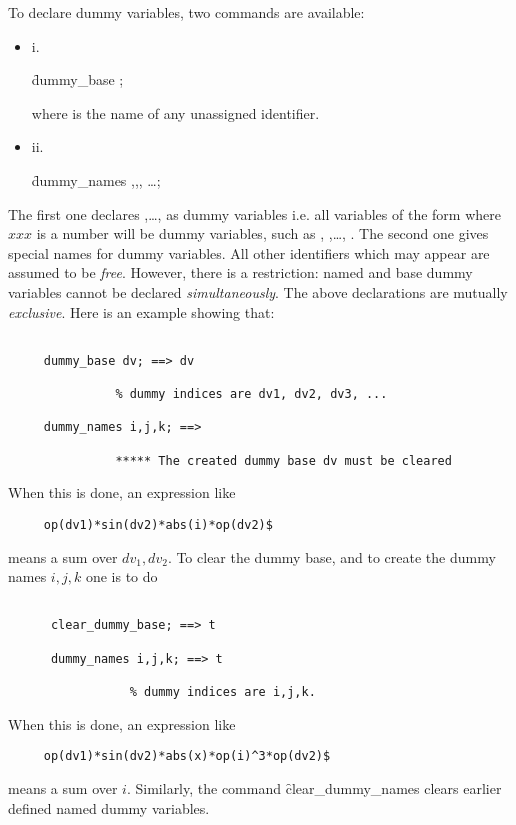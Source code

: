 \hypertarget{command:DUMMY_BASE}{}
\hypertarget{command:DUMMY_NAME}{}
To declare dummy variables, two commands are available:
\begin{itemize}
\item{i.}
\begin{syntax}
     \f{dummy\_base} ;
\end{syntax}
where  is the name of any unassigned identifier.
\item{ii.}
\begin{syntax}
     \f{dummy\_names} ,,, \ldots ;
\end{syntax}
\end{itemize}
The first one  declares ,\ldots, as dummy variables i.e.
all variables of the form  where $xxx$ is a number
will be dummy variables, such as , ,\ldots, .
The second one gives special names for dummy variables.
All other identifiers which may appear are assumed to be \emph{free}.
However, there is a restriction: named and base dummy variables 
cannot be declared \emph{simultaneously}. The above declarations are 
mutually \emph{exclusive}. 
Here is an example  showing that:
\begin{verbatim}

     dummy_base dv; ==> dv

               % dummy indices are dv1, dv2, dv3, ...

     dummy_names i,j,k; ==> 
                 
               ***** The created dummy base dv must be cleared
\end{verbatim}

When this is done, an expression like 
\begin{verbatim}
     op(dv1)*sin(dv2)*abs(i)*op(dv2)$
\end{verbatim}
means a sum over $dv_1,dv_2$.
To clear the dummy base, and to create the dummy names $i,j,k$ one is 
to do
\hypertarget{command:CLEAR_DUMMY_BASE}{}
\begin{verbatim}

      clear_dummy_base; ==> t

      dummy_names i,j,k; ==> t
                
                 % dummy indices are i,j,k.
\end{verbatim}
When this is done, an expression like
\begin{verbatim}
     op(dv1)*sin(dv2)*abs(x)*op(i)^3*op(dv2)$
\end{verbatim}
means a sum over $i$.
Similarly, the command \f{clear\_dummy\_names}
\hypertarget{command:CLEAR_DUMMY_NAMES}{}
clears earlier defined named dummy variables.

